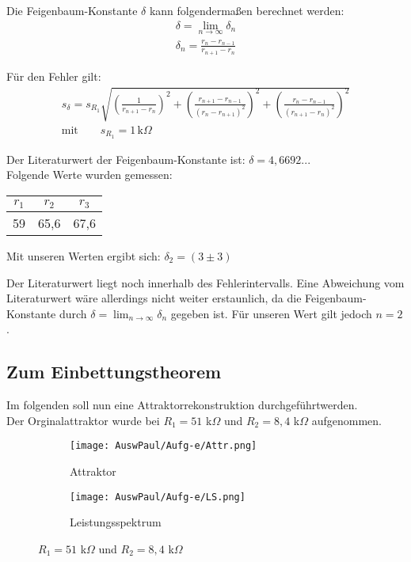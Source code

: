 Die Feigenbaum-Konstante \(\delta\) kann folgendermaßen berechnet werden: 
\begin{align}
    \delta = \lim_{n \to \infty} \delta_n \\
    \delta_n = \frac{r_n - r_{n-1}}{r_{n+1} -r_n}
\end{align}

Für den Fehler gilt: 
\begin{align}
    s_{\delta} = s_{R_1} \sqrt{ \left( \frac{1}{r_{n+1}-r_n}\right)^2 + \left(\frac{r_{n+1}-r_{n-1}}{(r_n - r_{n+1})^2}\right)^2 + \left(\frac{r_n - r_{n-1}}{(r_{n+1}-r_n)^2}\right)^2}\\
    \text{mit} \qquad s_{R_1} = 1 \, \text{k}\Omega
\end{align}

Der Literaturwert der Feigenbaum-Konstante ist: \(\delta = 4,6692...\)\\

Folgende Werte wurden gemessen: \\
\begin{tabular}{c c c}
    $r_1$ & $r_2$ & $r_3$\\
    \hline
    59 & 65,6 & 67,6
\end{tabular}

Mit unseren Werten ergibt sich: \(\delta_2 = (3 \pm 3)\)

Der Literaturwert liegt noch innerhalb des Fehlerintervalls. Eine Abweichung vom Literaturwert wäre allerdings nicht weiter erstaunlich, da die Feigenbaum-Konstante durch \( \delta = \lim_{n \to \infty} \delta_n\) gegeben ist. Für unseren Wert gilt jedoch \( n=2\).

\newpage
\subsection{Zum Einbettungstheorem}

Im folgenden soll nun eine Attraktorrekonstruktion durchgeführtwerden.\\
Der Orginalattraktor wurde bei $R_1 = 51$ k$\Omega$ und $R_2 = 8,4$ k$\Omega$ aufgenommen.

\begin{figure}[h]
    \centering
    \begin{subfigure}[b]{0.45\textwidth}
        \centering
        \texttt{[image: AuswPaul/Aufg-e/Attr.png]}
        \caption{Attraktor}
    \end{subfigure}
    \hfill
    \begin{subfigure}[b]{0.45\textwidth}
        \centering
        \texttt{[image: AuswPaul/Aufg-e/LS.png]}
        \caption{Leistungsspektrum}
    \end{subfigure}
    \caption{$R_1 = 51$ k$\Omega$ und $R_2 = 8,4$ k$\Omega$}
\end{figure}

